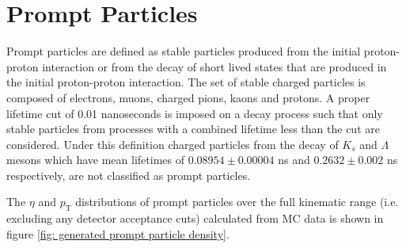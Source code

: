 \section{Prompt Particles}


Prompt particles are defined as stable particles produced from the initial proton-proton interaction or from the decay of short lived states that are produced in the initial proton-proton interaction. The set of stable charged particles is composed of electrons, muons, charged pions, kaons and protons. A proper lifetime cut of 0.01 nanoseconds is imposed on a decay process such that only stable particles from processes with a combined lifetime less than the cut are considered. Under this definition charged particles from the decay of $K_s$ and $\Lambda$ mesons which have mean lifetimes of $0.08954 \pm 0.00004$ ns and $0.2632 \pm 0.002$ ns respectively, are not classified as prompt particles.

The $\eta$ and $p_\mathrm{T}$ distributions of prompt particles over the full kinematic range (i.e. excluding any detector acceptance cuts) calculated from MC data is shown in figure \ref{fig: generated prompt particle density}.

